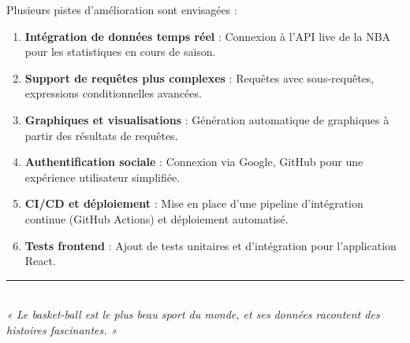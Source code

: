 \documentclass[12pt,a4paper]{report}
\begin{document}
Plusieurs pistes d'amélioration sont envisagées :

\begin{enumerate}
    \item \textbf{Intégration de données temps réel} : Connexion à l'API live de la NBA pour les statistiques en cours de saison.
    \item \textbf{Support de requêtes plus complexes} : Requêtes avec sous-requêtes, expressions conditionnelles avancées.
    \item \textbf{Graphiques et visualisations} : Génération automatique de graphiques à partir des résultats de requêtes.
    \item \textbf{Authentification sociale} : Connexion via Google, GitHub pour une expérience utilisateur simplifiée.
    \item \textbf{CI/CD et déploiement} : Mise en place d'une pipeline d'intégration continue (GitHub Actions) et déploiement automatisé.
    \item \textbf{Tests frontend} : Ajout de tests unitaires et d'intégration pour l'application React.
\end{enumerate}

\vspace{2cm}

\begin{center}
\rule{0.5\textwidth}{0.4pt}\\[0.5cm]
\textit{« Le basket-ball est le plus beau sport du monde, et ses données racontent des histoires fascinantes. »}
\end{center}
\end{document}
